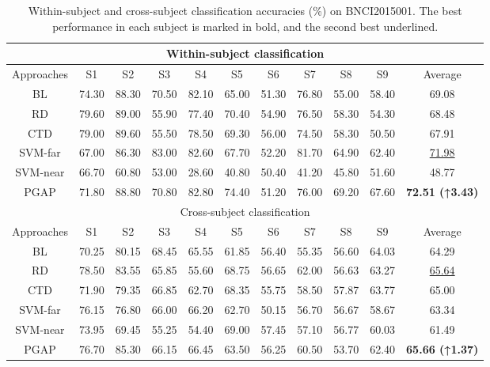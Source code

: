 \documentclass[journal,twocolumn]{IEEEtran}
\begin{document}
\begin{table}[htpb] \centering
  \caption{Within-subject and cross-subject classification accuracies (\%) on BNCI2015001. The best performance in each subject is marked in bold, and the second best underlined.}
  \label{tab:2015001-result}
  \begin{tabular}{c|c|c|c|c|c|c|c|c|c|c}
  \toprule
  \multicolumn{11}{c}{Within-subject classification} \\
  \midrule
  Approaches & S1 & S2 & S3 & S4 & S5 & S6 & S7 & S8 & S9 & Average \\
  \midrule
  BL & 74.30 & 88.30 & 70.50 & 82.10 & 65.00 & 51.30 & 76.80 & 55.00 & 58.40 & 69.08 \\
  RD & 79.60 & 89.00 & 55.90 & 77.40 & 70.40 & 54.90 & 76.50 & 58.30 & 54.30 & 68.48 \\
  CTD & 79.00 & 89.60 & 55.50 & 78.50 & 69.30 & 56.00 & 74.50 & 58.30 & 50.50 & 67.91 \\
  SVM-far & 67.00 & 86.30 & 83.00 & 82.60 & 67.70 & 52.20 & 81.70 & 64.90 & 62.40 & \underline{71.98} \\
  SVM-near & 66.70 & 60.80 & 53.00 & 28.60 & 40.80 & 50.40 & 41.20 & 45.80 & 51.60 & 48.77 \\
  PGAP & 71.80 & 88.80 & 70.80 & 82.80 & 74.40 & 51.20 & 76.00 & 69.20 & 67.60 & \textbf{72.51 (↑3.43)} \\
  \midrule
  \multicolumn{11}{c}{Cross-subject classification} \\
  \midrule
  Approaches & S1 & S2 & S3 & S4 & S5 & S6 & S7 & S8 & S9 & Average \\
  \midrule
  BL & 70.25 & 80.15 & 68.45 & 65.55 & 61.85 & 56.40 & 55.35 & 56.60 & 64.03 & 64.29 \\
  RD & 78.50 & 83.55 & 65.85 & 55.60 & 68.75 & 56.65 & 62.00 & 56.63 & 63.27 & \underline{65.64} \\
  CTD & 71.90 & 79.35 & 66.85 & 62.70 & 68.35 & 55.75 & 58.50 & 57.87 & 63.77 & 65.00 \\
  SVM-far & 76.15 & 76.80 & 66.00 & 66.20 & 62.70 & 50.15 & 56.70 & 56.67 & 58.67 & 63.34 \\
  SVM-near & 73.95 & 69.45 & 55.25 & 54.40 & 69.00 & 57.45 & 57.10 & 56.77 & 60.03 & 61.49 \\
  PGAP & 76.70 & 85.30 & 66.15 & 66.45 & 63.50 & 56.25 & 60.50 & 53.70 & 62.40 & \textbf{65.66 (↑1.37)} \\
  \bottomrule
  \end{tabular}
\end{table}
\end{document}
